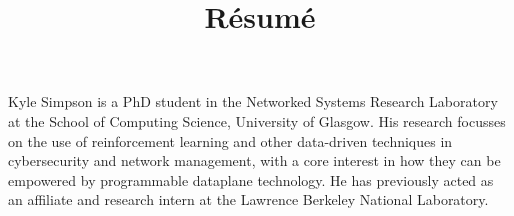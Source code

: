 \documentclass[11pt, a4paper]{moderncv}
\title{R\'{e}sum\'{e}}
\begin{document}
\nocite{*}
	
\makecvtitle

\vspace{-2.5em}

Kyle Simpson is a PhD student in the Networked Systems Research Laboratory at the School of Computing Science, University of Glasgow.
His research focusses on the use of reinforcement learning and other data-driven techniques in cybersecurity and network management, with a core interest in how they can be empowered by programmable dataplane technology.
He has previously acted as an affiliate and research intern at the Lawrence Berkeley National Laboratory.






\end{document}
